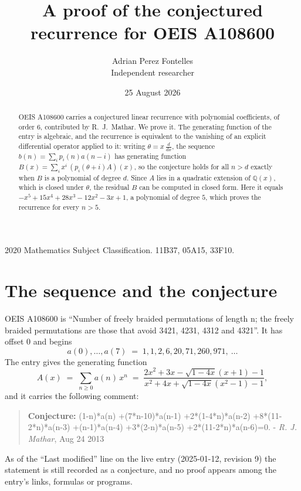 \documentclass[11pt,a4paper]{article}
\title{A proof of the conjectured recurrence for OEIS A108600}
\author{Adrian Perez Fontelles\\ \small Independent researcher}
\date{25 August 2026}
\theoremstyle{plain}
\theoremstyle{definition}
\begin{document}
\maketitle

\begin{abstract}
OEIS A108600 carries a conjectured linear recurrence with polynomial coefficients, of
order 6, contributed by R.~J.~Mathar. We prove it. The generating function of the
entry is algebraic, and the recurrence is equivalent to the vanishing of an explicit
differential operator applied to it: writing $\theta=x\,\frac{d}{dx}$, the sequence
$b(n)=\sum_{i}p_{i}(n)a(n-i)$ has generating function
$B(x)=\sum_{i}x^{i}\,(p_{i}(\theta+i)A)(x)$, so the conjecture holds for all $n>d$ exactly
when $B$ is a polynomial of degree $d$. Since $A$ lies in a quadratic extension of
$\mathbb{Q}(x)$, which is closed under $\theta$, the residual $B$ can be computed in
closed form. Here it equals $- x^{5} + 15 x^{4} + 28 x^{3} - 12 x^{2} - 3 x + 1$, a polynomial of degree $5$, which proves
the recurrence for every $n>5$.
\end{abstract}

\noindent\small 2020 Mathematics Subject Classification. 11B37, 05A15, 33F10.\normalsize

\section{The sequence and the conjecture}

OEIS A108600 is ``Number of freely braided permutations of length n; the freely braided permutations are those that avoid 3421, 4231, 4312 and 4321''. It has offset $0$ and begins
\[
a(0),\dots,a(7)\;=\;1, 1, 2, 6, 20, 71, 260, 971,\ \dots
\]
The entry gives the generating function
\begin{equation}\label{eq:gf}
A(x)\;=\;\sum_{n\ge 0} a(n)\,x^{n}\;=\;\frac{2 x^{2} + 3 x - \sqrt{1 - 4 x} \left(x + 1\right) - 1}{x^{2} + 4 x + \sqrt{1 - 4 x} \left(x^{2} - 1\right) - 1} ,
\end{equation}
and it carries the following comment:
\begin{quote}\small
\textbf{Conjecture:} (1-n)*a(n) +(7*n-10)*a(n-1) +2*(1-4*n)*a(n-2) +8*(11-2*n)*a(n-3) +(n-1)*a(n-4) +3*(2-n)*a(n-5) +2*(11-2*n)*a(n-6)=0. - \emph{R. J. Mathar}, Aug 24 2013
\end{quote}
As of the ``Last modified'' line on the live entry (2025-01-12, revision 9) the
statement is still recorded as a conjecture, and no proof appears among the entry's links,
formulas or programs.
\end{document}
